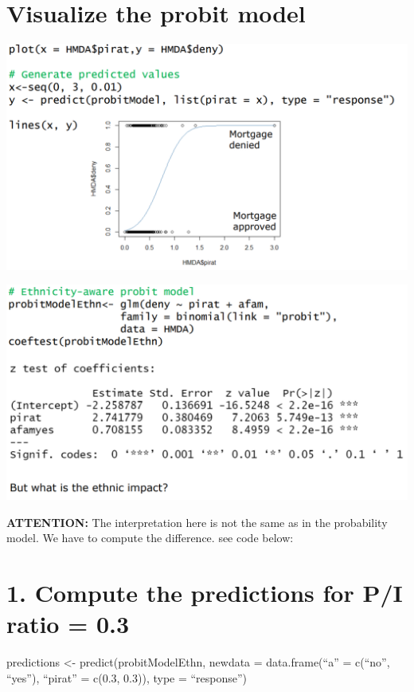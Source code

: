 \documentclass[
]{article}
\begin{document}
\hypertarget{visualize-the-probit-model}{%
\section{Visualize the probit model}\label{visualize-the-probit-model}}

\includegraphics[width=1\linewidth]{impact}

\includegraphics[width=1\linewidth]{probit}

\textbf{ATTENTION:} The interpretation here is not the same as in the
probability model. We have to compute the difference. see code below:

\hypertarget{compute-the-predictions-for-pi-ratio-0.3}{%
\section{1. Compute the predictions for P/I ratio =
0.3}\label{compute-the-predictions-for-pi-ratio-0.3}}

predictions \textless- predict(probitModelEthn, newdata =
data.frame(``a'' = c(``no'', ``yes''), ``pirat'' = c(0.3, 0.3)), type =
``response'')
\end{document}
